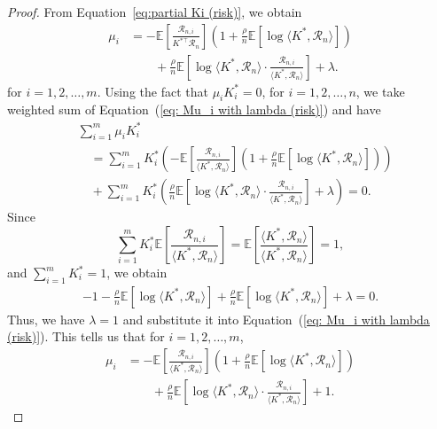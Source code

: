 \begin{proof}
From Equation~\eqref{eq:partial Ki (risk)}, we obtain
    \begin{align} \label{eq: Mu_i with lambda (risk)}
        \mu_i 
        &= -\mathbb{E}\left[ \frac{\mathcal{R}_{n,i}}{K^{*\top}\mathcal{R}_n} \right] \left( 1 + \frac{\rho}{n}\mathbb{E}\left[ \log \langle K^{*}, \mathcal{R}_n \rangle \right] \right) \nonumber \\
        &\qquad +\frac{\rho}{n}\mathbb{E}\left[ \log \langle K^{*}, \mathcal{R}_n \rangle \cdot \frac{\mathcal{R}_{n,i}}{ \langle K^{*}, \mathcal{R}_n \rangle }  \right] +\lambda.
    \end{align}
for $i=1,2, \ldots, m$. Using the fact that $\mu_i K_i^* = 0$, for $i=1,2,\dots,n$, we take weighted sum of Equation~(\ref{eq: Mu_i with lambda (risk)}) and have
    \begin{align*}
        &\sum_{i=1}^m \mu_i K_i^* \\
        &\quad = \sum_{i=1}^m K_i^* \left( -\mathbb{E}\left[ \frac{\mathcal{R}_{n,i}}{ \langle K^{*}, \mathcal{R}_n \rangle } \right] \left( 1 + \frac{\rho}{n}\mathbb{E}\left[ \log \langle K^{*}, \mathcal{R}_n \rangle \right] \right) \right) \\
        &\quad + \sum_{i=1}^m K_i^* \left( \frac{\rho}{n} \mathbb{E} \left[ \log \langle K^{*}, \mathcal{R}_n\rangle \cdot \frac{ \mathcal{R}_{n,i} }{\langle K^{*}, \mathcal{R}_n \rangle}  \right] + \lambda \right) = 0. 
    \end{align*}
Since 
$$
\sum_{i=1}^m K_i^* \mathbb{E}\left[ \frac{\mathcal{R}_{n,i}}{\langle K^{*}, \mathcal{R}_n \rangle } \right] 
= \mathbb{E}\left[  \frac{\langle K^{*}, \mathcal{R}_n \rangle }{\langle K^{*}, \mathcal{R}_n \rangle} \right] = 1, 
$$
and $\sum_{i=1}^m K_i^* = 1$, we obtain
    \begin{align}
        -1 - \frac{\rho}{n} \mathbb{E}\left[ \log \langle K^{*}, \mathcal{R}_n \rangle \right] + \frac{\rho}{n} \mathbb{E}\left[ \log \langle K^{*}, \mathcal{R}_n \rangle \right] +\lambda = 0.
    \end{align}
Thus, we have $\lambda=1$ and substitute it into Equation~(\ref{eq: Mu_i with lambda (risk)}). This tells us that for $i=1,2, \ldots, m$,
    \begin{align*}
        \mu_i 
        &= -\mathbb{E}\left[ \frac{\mathcal{R}_{n,i}}{\langle K^{*}, \mathcal{R}_n \rangle } \right] \left( 1 + \frac{\rho}{n} \mathbb{E}\left[ \log \langle K^{*}, \mathcal{R}_n \rangle \right] \right) \nonumber \\
        &\qquad + \frac{\rho}{n}\mathbb{E}\left[ \log \langle K^{*}, \mathcal{R}_n \rangle  \cdot \frac{\mathcal{R}_{n,i}}{\langle K^{*}, \mathcal{R}_n \rangle }  \right] + 1.

\end{align*}
\end{proof}
